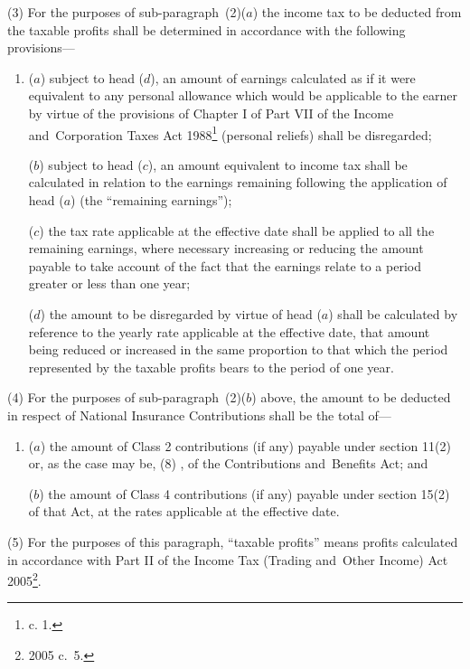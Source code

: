 \documentclass[12pt,a4paper]{article}
\begin{document}
(3) For the purposes of sub-paragraph~(2)($a$) the income tax to be deducted from the 
taxable profits shall be determined in accordance with the following provisions—
\begin{enumerate}\item[]
($a$) subject to head ($d$), an amount of earnings 
calculated as if it were equivalent to any personal allowance which would be  %
applicable to the earner by virtue of the provisions of Chapter I of Part VII of the Income and~Corporation Taxes Act 1988\footnote{ c. 1.} (personal reliefs) shall be disregarded;

($b$) subject to head ($c$), an amount equivalent to income tax shall be calculated in relation to the earnings remaining following the application of head ($a$) (the “remaining earnings”);

($c$) the tax rate applicable at the effective date shall be applied to all the remaining earnings, where necessary increasing or reducing the amount payable to take account of the fact that the earnings relate to a period greater or less than one year;

($d$) the amount to be disregarded by virtue of head ($a$) shall be calculated by reference to the yearly rate applicable at the effective date, that amount being reduced or increased in the same proportion to that which the period represented by the taxable profits bears to the period of one year.
\end{enumerate}

(4) For the purposes of sub-paragraph~(2)($b$) above, the amount to be deducted in respect of National Insurance Contributions shall be the total of—
\begin{enumerate}\item[]
($a$) the amount of Class 2 contributions (if any) payable under 
section 11(2) or, as the case may be, (8)%
, of the Contributions and~Benefits Act; and

($b$) the amount of Class 4 contributions (if any) payable under section 15(2) of that Act,
at the rates applicable at the effective date.
\end{enumerate}

(5) For the purposes of this paragraph, “taxable profits” means profits calculated in accordance with Part II of the Income Tax (Trading and~Other Income) Act 2005\footnote{2005 c.\ 5.}.
\end{document}
